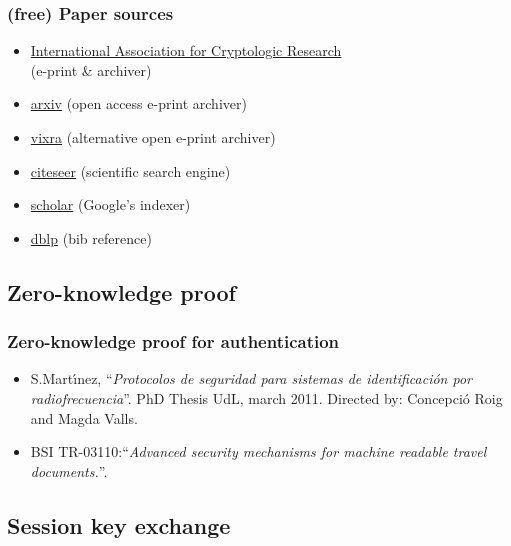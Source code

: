 \documentclass{beamer}
\begin{document}
\begin{frame}
\frametitle{(free) Paper sources}
\begin{itemize}
 \item \href{http://www.iacr.org/}{International Association for Cryptologic Research}\\(e-print \& archiver)
 \item \href{http://arxiv.org(}{arxiv} (open access e-print archiver)
 \item \href{http://vixra.org/}{vixra} (alternative open e-print archiver)
 \item \href{http://citeseerx.ist.psu.edu/}{citeseer} (scientific search engine)
 \item \href{http://scholar.google.com/}{scholar} (Google's indexer)
 \item \href{http://www.informatik.uni-trier.de/~ley/db/}{dblp} (bib reference)
\end{itemize} 
\end{frame}

\subsection{Zero-knowledge proof}

\begin{frame}
\frametitle{Zero-knowledge proof for authentication}
    \begin{itemize}
        \item S.Mart\'{\i}nez, ``\emph{Protocolos de seguridad para sistemas de identificaci\'on por radiofrecuencia}''. PhD Thesis UdL, march 2011. Directed by: Concepci\'o Roig and Magda Valls.\cite{Santi11}
        \item BSI TR-03110:``\emph{Advanced security mechanisms for machine readable travel documents.}''.\cite{BSI_TR-03110}
    \end{itemize}
\end{frame}

\subsection{Session key exchange}
\end{document}
